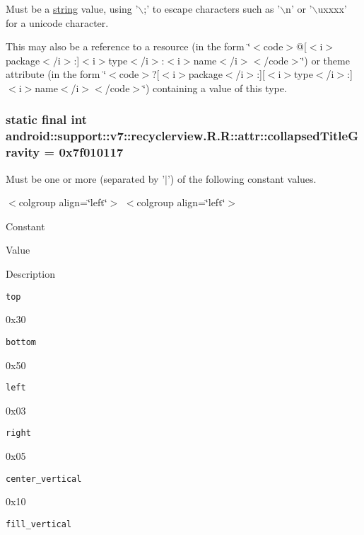 Must be a \hyperlink{classandroid_1_1support_1_1v7_1_1recyclerview_1_1_r_1_1string}{string} value, using '$\backslash$;' to escape characters such as '$\backslash$n' or '$\backslash$uxxxx' for a unicode character. 

This may also be a reference to a resource (in the form \char`\"{}$<$code$>$@\mbox{[}$<$i$>$package$<$/i$>$:\mbox{]}$<$i$>$type$<$/i$>$:$<$i$>$name$<$/i$>$$<$/code$>$\char`\"{}) or theme attribute (in the form \char`\"{}$<$code$>$?\mbox{[}$<$i$>$package$<$/i$>$:\mbox{]}\mbox{[}$<$i$>$type$<$/i$>$:\mbox{]}$<$i$>$name$<$/i$>$$<$/code$>$\char`\"{}) containing a value of this type. \hypertarget{classandroid_1_1support_1_1v7_1_1recyclerview_1_1_r_1_1attr_19d93a9a13a41b73bdc3c032ee00911f}{
\subsubsection[{collapsedTitleGravity}]{\setlength{\rightskip}{0pt plus 5cm}static final int android::support::v7::recyclerview.R.R::attr::collapsedTitleGravity = 0x7f010117}}
\label{classandroid_1_1support_1_1v7_1_1recyclerview_1_1_r_1_1attr_19d93a9a13a41b73bdc3c032ee00911f}


Must be one or more (separated by '$|$') of the following constant values. \begin{TabularC}{0}
\hline
\end{TabularC}
$<$colgroup align=\char`\"{}left\char`\"{}$>$ $<$colgroup align=\char`\"{}left\char`\"{}$>$ 

Constant

Value

Description 

{\tt top}

0x30

{\tt bottom}

0x50

{\tt left}

0x03

{\tt right}

0x05

{\tt center\_\-vertical}

0x10

{\tt fill\_\-vertical}

